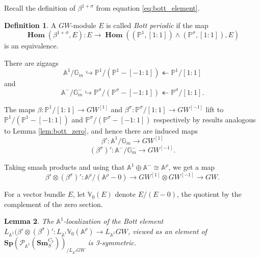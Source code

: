 \documentclass[edeposit,fullpage]{uiucthesis2009}
\newcommand{\mbb}{\mathbb}
\newcommand{\mc}{\mathcal}
\newcommand{\Sm}[1]{\mathbf{Sm}_{#1}}
\newcommand{\Sp}{\mathbf{Sp}}
\DeclareMathOperator{\iHom}{\mathbf{Hom}}
\theoremstyle{plain}
\newtheorem{lemma}{Lemma}
\numberwithin{lemma}{section}
\theoremstyle{definition}
\newtheorem{definition}[lemma]{Definition}
\begin{document}
Recall the definition of $\beta^{1+\sigma}$ from equation
\eqref{eq:bott_element}.

\begin{definition}
A $GW$-module $E$ is called \emph{Bott periodic} if the map
\[
\iHom(\beta^{1+\sigma},E): E
\rightarrow \iHom((\mbb P^1,[1:1])\wedge (\mbb P^\sigma,[1:1]),E)
\]
is an equivalence.
\end{definition}

There are zigzags
\[
\mbb A^1/\mbb G_m \hookrightarrow \mbb P^1/(\mbb P^1 - [-1:1])
\twoheadleftarrow \mbb P^1/[1:1]
\]
and 
\[
\mbb A^-/\mbb G_m^- \hookrightarrow \mbb P^\sigma/(\mbb P^\sigma - [-1:1])
\twoheadleftarrow \mbb P^\sigma/[1:1].
\]

The maps $\beta :  \mbb P^1/[1:1] \rightarrow GW^{[1]}$ and
$\beta^\sigma : \mbb P^\sigma/[1:1] \rightarrow GW^{[-1]}$ lift to
$\mbb P^1/(\mbb P^1 - [-1:1])$ and $\mbb P^\sigma/(\mbb P^\sigma -
[-1:1])$ respectively by results analogous to Lemma
\ref{lem:bott_zero}, and hence there are induced maps 
\[
\beta' : \mbb A^1/\mbb G_m \rightarrow GW^{[1]}
\]
\[
(\beta^\sigma)' : \mbb A^-/\mbb G_m^- \rightarrow GW^{[-1]}.
\]

Taking smash products and using that $\mbb A^1 \oplus \mbb A^- \cong
\mbb A^\rho$, we get a map
\[
\beta' \otimes (\beta^\sigma)' : \mbb
A^\rho/(\mbb A^\rho - 0) \rightarrow GW^{[1]} \otimes GW^{[-1]}
\rightarrow GW.
\]

For a vector bundle $E$, let $\mbb V_0(E)$ denote $E/(E-0)$, the
quotient by the complement of the zero section.

\begin{lemma}\label{lem:bott_3symm}
The $\mbb A^1$-localization of the Bott element $L_{\mbb A^1}(\beta'
\otimes (\beta^\sigma)' : L_{\mbb A^1} \mbb V_0(\mbb A^\rho)
\rightarrow L_{\mbb A^1} GW$, viewed as an element of $\Sp(\mc P_{\mbb
  A^1}(\Sm{S}^{C_2}))_{/L_{\mbb A^1}GW}$ is 3-symmetric.
\end{lemma}
\end{document}
